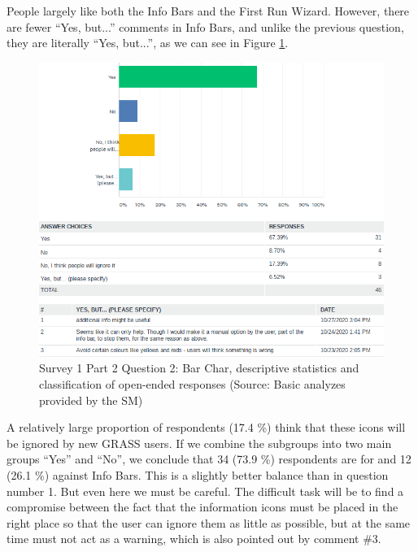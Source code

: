\documentclass[a4paper,10pt,twoside]{article}
\begin{document}
\noindent People largely like both the Info Bars and the First Run Wizard. However, there are fewer ``Yes, but...'' comments in Info Bars, and unlike the previous question, they are literally ``Yes, but...'', as we can see in Figure \ref{fig:survey1_part2_question2_all}. 

\vspace{0.3cm}
\begin{figure}[hbt!] 
\begin{center}
\includegraphics[width=15.5cm]{../surveys/analyzed_data/survey1_part2_question2_all.png} 
\caption[Survey 1 Part 2 Question 2: Bar Char descriptive statistics and classification of open-ended responses]{Survey 1 Part 2 Question 2: Bar Char, descriptive statistics and classification of  open-ended responses (Source: Basic analyzes provided by the SM)}
\label{fig:survey1_part2_question2_all}
\end{center}
\end{figure}

\noindent A relatively large proportion of respondents (17.4 \%) think that these icons will be ignored by new GRASS users. If we combine the subgroups into two main groups ``Yes'' and ``No'', we conclude that 34 (73.9 \%) respondents are for and 12 (26.1 \%) against Info Bars. This is a slightly better balance than in question number 1. But even here we must be careful. The difficult task will be to find a compromise between the fact that the information icons must be placed in the right place so that the user can ignore them as little as possible, but at the same time must not act as a warning, which is also pointed out by comment \#3.
\end{document}
